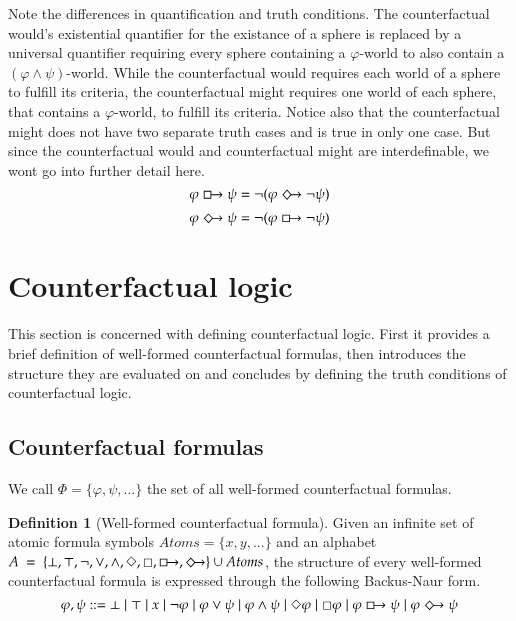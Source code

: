 \documentclass[a4paper,american]{paper}
\theoremstyle{definition}\newtheorem{definition}{Definition}
\begin{document}
\noindent Note the differences in quantification and truth conditions. The counterfactual would's existential quantifier for the existance of a sphere is replaced by a universal quantifier requiring every sphere containing a $\varphi$-world to also contain a $(\varphi\wedge\psi)$-world. While the counterfactual would requires each world of a sphere to fulfill its criteria, the counterfactual might requires one world of each sphere, that contains a $\varphi$-world, to fulfill its criteria. Notice also that the counterfactual might does not have two separate truth cases and is true in only one case. But since the counterfactual would and counterfactual might are interdefinable, we wont go into further detail here.
\begin{equation}
\varphi\boxright\psi = \neg (\varphi\Diamondright\neg\psi )
\end{equation}
\begin{equation}
\varphi\Diamondright\psi = \neg (\varphi\boxright\neg\psi )
\end{equation}

\section{Counterfactual logic}
This section is concerned with defining counterfactual logic. First it provides a brief definition of well-formed counterfactual formulas, then introduces the structure they are evaluated on and concludes by defining the truth conditions of counterfactual logic.

\subsection{Counterfactual formulas}
We call $\Phi = \{\varphi ,\psi ,...\}$ the set of all well-formed counterfactual formulas.
\begin{definition}[Well-formed counterfactual formula]
Given an infinite set of atomic formula symbols $Atoms = \{ x, y, ...\}$ and an alphabet $A~=~\{\bot ,\top ,\neg ,\vee ,\wedge ,\Diamond ,\Box ,\boxright ,\Diamondright\}\cup Atoms$, the structure of every well-formed counterfactual formula is expressed through the following Backus-Naur form.
\begin{equation}
\varphi, \psi ::= \bot \mid \top \mid x \mid \neg \varphi \mid \varphi \vee \psi \mid \varphi \wedge \psi \mid \Diamond \varphi \mid \Box \varphi \mid \varphi \boxright \psi \mid \varphi \Diamondright \psi
\end{equation}
\end{definition}
\end{document}
